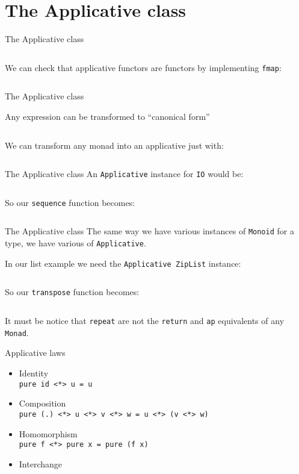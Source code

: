 \documentclass[10pt]{beamer}
\begin{document}
\section{The Applicative class}

\begin{frame}{The Applicative class}

  \inputminted{haskell}{../src/applicative.hs}

  We can check that applicative functors are functors by implementing
  \verb~fmap~:

  \inputminted{haskell}{../src/fmap.hs}
\end{frame}

\begin{frame}{The Applicative class}

  Any expression can be transformed to ``canonical form''

  \inputminted{text}{../src/canonical.txt}

  We can transform any monad into an applicative just with:

  \inputminted{haskell}{../src/to_monad.hs}
\end{frame}

\begin{frame}{The Applicative class}
  An \verb~Applicative~ instance for \verb~IO~ would be:

  \inputminted{haskell}{../src/io_instance.hs}

  So our \verb~sequence~ function becomes:

  \inputminted{haskell}{../src/sequence_ap.hs}
\end{frame}

\begin{frame}{The Applicative class}
  The same way we have various instances of \verb~Monoid~ for a type,
  we have various of \verb~Applicative~.

  In our list example we need the \verb~Applicative ZipList~ instance:

  \inputminted{haskell}{../src/ListInstance.hs}

  So our \verb~transpose~ function becomes:

  \inputminted{haskell}{../src/transpose_ap.hs}

  It must be notice that \verb~repeat~ are not the \verb~return~ and
  \verb~ap~ equivalents of any \verb~Monad~.

\end{frame}

\begin{frame}{Applicative laws}
  \begin{itemize}
  \item Identity\\
    \verb~pure id <*> u = u~
  \item Composition\\
    \verb~pure (.) <*> u <*> v <*> w = u <*> (v <*> w)~
  \item Homomorphism\\
    \verb~pure f <*> pure x = pure (f x)~
  \item Interchange
  \end{itemize}
\end{frame}
\end{document}
